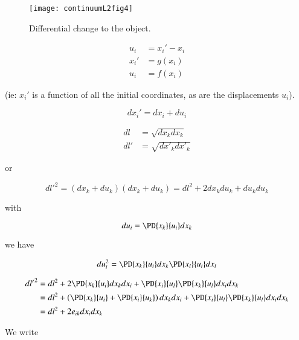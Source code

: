 \begin{figure}[htp]
   \centering
   \texttt{[image: continuumL2fig4]}
   \caption{Differential change to the object.}\label{fig:continuumL2:continuumL2fig4}
\end{figure}

\begin{align}\label{eqn:continuumL2:50}
u_i &= x_i' - x_i \\
x_i' &= g(x_i) \\
u_i &= f(x_i)
\end{align}

(ie: $x_i'$ is a function of all the initial coordinates, as are the displacements $u_i$).

\begin{equation}\label{eqn:continuumL2:70}
dx_i' = dx_i + du_i
\end{equation}

\begin{align}\label{eqn:continuumL2:90}
dl &= \sqrt{dx_k dx_k} \\
dl' &= \sqrt{d{x'}_k d{x'}_k}
\end{align}

or

\begin{equation}\label{eqn:continuumL2:110}
{dl'}^2 = 
(dx_k + du_k)
(dx_k + du_k)
= 
dl^2 + 2 dx_k du_k + du_k du_k
\end{equation}

with 

\begin{equation}\label{eqn:continuumL2:130}
du_i = \PD{x_k}{u_i} dx_k
\end{equation}

we have

\begin{equation}\label{eqn:continuumL2:150}
du_i^2 = 
\PD{x_k}{u_i} dx_k
\PD{x_l}{u_i} dx_l
\end{equation}

\begin{align*}
{dl'}^2 
&= 
dl^2 
+ 2 \PD{x_k}{u_i} dx_k dx_i 
+ \PD{x_i}{u_l} 
\PD{x_k}{u_l} 
dx_i dx_k \\
&= 
dl^2 
+ 
\left(
\PD{x_k}{u_i} 
+
\PD{x_i}{u_k} 
\right)
dx_k dx_i 
+ \PD{x_i}{u_l} 
\PD{x_k}{u_l} 
dx_i dx_k \\
&=
dl^2 
+ 
2 e_{ik} dx_i dx_k
\end{align*}

We write

